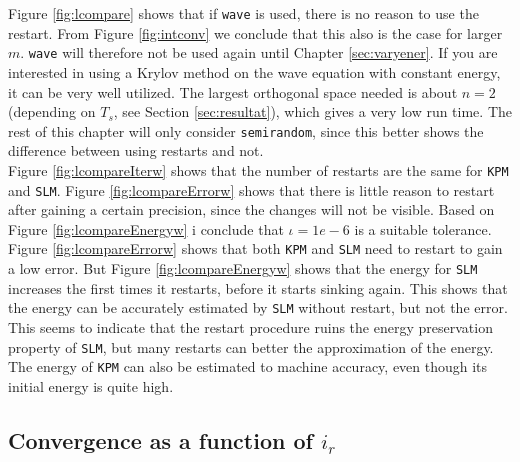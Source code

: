Figure \ref{fig:lcompare} shows that if \texttt{wave} is used, there is no reason to use the restart. From Figure \ref{fig:intconv} we conclude that this also is the case for larger $m$. \texttt{wave} will therefore not be used again until Chapter \ref{sec:varyener}. If you are interested in using a Krylov method on the wave equation with constant energy, it can be very well utilized. The largest orthogonal space needed is about $n=2$ (depending on $T_s$, see Section \ref{sec:resultat}), which gives a very low run time.
The rest of this chapter will only consider \texttt{semirandom}, since this better shows the difference between using restarts and not. \\

\noindent Figure \ref{fig:lcompareIterw} shows that the number of restarts are the same for \texttt{KPM} and \texttt{SLM}. Figure \ref{fig:lcompareErrorw} shows that there is little reason to restart after gaining a certain precision, since the changes will not be visible. Based on Figure \ref{fig:lcompareEnergyw} i conclude that $\iota = 1e-6$ is a suitable tolerance. \\

\noindent Figure \ref{fig:lcompareErrorw} shows that both \texttt{KPM} and \texttt{SLM} need to restart to gain a low error. But Figure \ref{fig:lcompareEnergyw} shows that the energy for \texttt{SLM} increases the first times it restarts, before it starts sinking again. This shows that the energy can be accurately estimated by \texttt{SLM} without restart, but not the error. This seems to indicate that the restart procedure ruins the energy preservation property of \texttt{SLM}, but many restarts can better the approximation of the energy. The energy of \texttt{KPM} can also be estimated to machine accuracy, even though its initial energy is quite high.\\

\subsection{Convergence as a function of $i_r$} %

